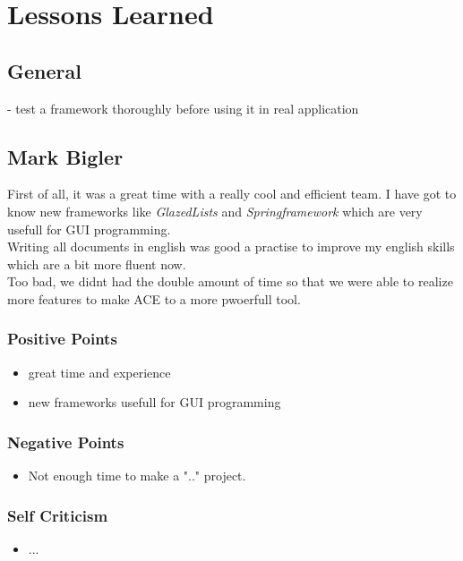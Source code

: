 \chapter{Lessons Learned}
\label{chapter:lessonslearned}



\section{General}

- test a framework thoroughly before using it in real application

\newpage
\section{Mark Bigler}
First of all, it was a great time with a really cool and efficient team. I have got to know new frameworks like \textit{GlazedLists} and \textit{Springframework} which are very usefull for GUI programming. \\

Writing all documents in english was good a practise to improve my english skills which are a bit more fluent now. \\

Too bad, we didnt had the double amount of time so that we were able to realize more features to make ACE to a more pwoerfull tool.
\subsection{Positive Points}
\begin{itemize}
\item great time and experience
\item new frameworks usefull for GUI programming
\end{itemize}

\subsection{Negative Points}
\begin{itemize}
\item Not enough time to make a ".." project.
\end{itemize}

\subsection{Self Criticism}
\begin{itemize}
\item ...
\end{itemize}

